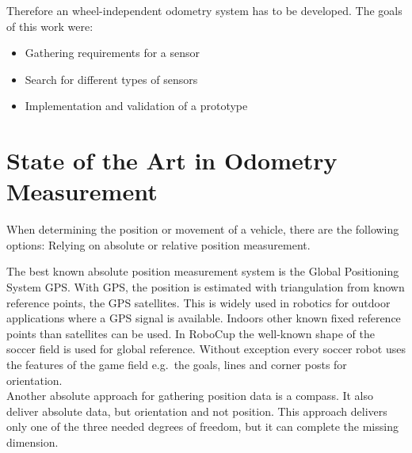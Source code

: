\documentclass[12pt,a4paper]{article}
\begin{document}
Therefore an wheel-independent odometry system has to be developed.
The goals of this work were:
\begin{itemize}
  \item Gathering requirements for a sensor
  \item Search for different types of sensors
  \item Implementation and validation of a prototype
\end{itemize}




\clearpage
\section{State of the Art in Odometry Measurement}
 


When determining the position or movement of a vehicle, there are the following options: 
Relying on absolute or relative position measurement.

The best known absolute position measurement system is the Global Positioning System GPS.
With GPS, the position is estimated with triangulation from known reference points, the GPS satellites. %
This is widely used in robotics for outdoor applications where a GPS signal is available.
Indoors other known fixed reference points than satellites can be used.
In RoboCup the well-known shape of the soccer field is used for global reference.
Without exception every soccer robot uses the features of the game field e.g.\ the goals, lines and corner posts for orientation.\\
Another absolute approach for gathering position data is a compass.
It also deliver absolute data, but orientation and not position. 
This approach delivers only one of the three needed degrees of freedom, but it can complete the missing dimension.

\end{document}
